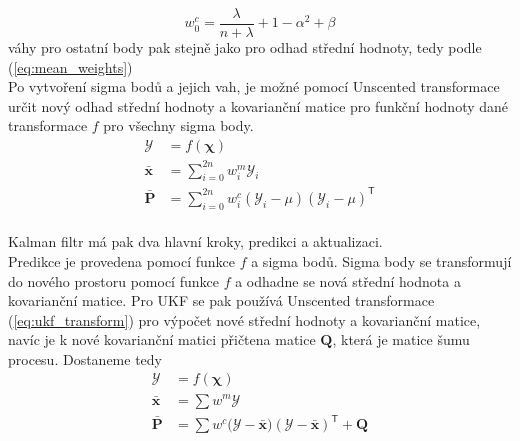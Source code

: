 \documentclass[a4paper,12pt]{article}
\begin{document}
\begin{equation}
   w^c_0 = \frac{\lambda}{n + \lambda} + 1 - \alpha^2 + \beta
\end{equation}
váhy pro ostatní body pak stejně jako pro odhad střední hodnoty, tedy podle (\ref{eq:mean_weights})
\\
Po vytvoření sigma bodů a jejich vah, je možné pomocí Unscented transformace určit nový odhad střední hodnoty a kovarianční matice pro funkční hodnoty dané transformace $f$ pro všechny sigma body.
\begin{equation}
    \begin{aligned}
    \boldsymbol{\mathcal{Y}} &= f(\boldsymbol{\chi}) \\
    \mathbf{\bar{x}} &= \sum_{i=0}^{2n} w^m_i\boldsymbol{\mathcal{Y}}_i \\
    \mathbf{\bar{P}} &= \sum_{i=0}^{2n} w^c_i{(\boldsymbol{\mathcal{Y}}_i-\mu)(\boldsymbol{\mathcal{Y}}_i-\mu)^\mathsf{T}}
    \end{aligned}
    \label{eq:ukf_transform}
\end{equation}
\\
Kalman filtr má pak dva hlavní kroky, predikci a aktualizaci.\\

Predikce je provedena pomocí funkce $f$ a sigma bodů. Sigma body se transformují do nového prostoru pomocí funkce $f$ a odhadne se nová střední hodnota a kovarianční matice.
Pro UKF se pak používá Unscented transformace (\ref{eq:ukf_transform}) pro výpočet nové střední hodnoty a kovarianční matice, 
navíc je k nové kovarianční matici přičtena matice $\mathbf Q$, která je matice šumu procesu. Dostaneme tedy
\begin{equation}
    \begin{aligned}
        \boldsymbol{\mathcal Y} &= f(\boldsymbol\chi) \\
        \mathbf{\bar x} &= \sum w^m\boldsymbol{\mathcal Y}  \\
        \mathbf{\bar P} &= \sum w^c({\boldsymbol{\mathcal Y} - \mathbf{\bar x})(\boldsymbol{\mathcal Y} - \mathbf{\bar x})^\mathsf T}+\mathbf Q \\
    \end{aligned}
    \label{eq:ukf_predict}
\end{equation}
\end{document}
